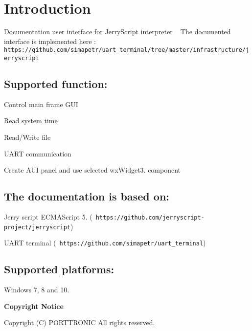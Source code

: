 \section*{{\bfseries{Introduction}}}

Documentation user interface for Jerry\+Script interpreter ~\newline
 The documented interface is implemented here \+:~\newline
 {\texttt{ https\+://github.\+com/simapetr/uart\+\_\+terminal/tree/master/infrastructure/jerryscript}}

\subsection*{Supported function\+:}


\begin{DoxyItemize}
\item Control main frame G\+UI
\item Read system time
\item Read/\+Write file
\item U\+A\+RT communication
\item Create A\+UI panel and use selected wx\+Widget3. component
\end{DoxyItemize}

\subsection*{The documentation is based on\+:}


\begin{DoxyItemize}
\item Jerry script E\+C\+M\+A\+Script 5. ({\texttt{ https\+://github.\+com/jerryscript-\/project/jerryscript}})
\item U\+A\+RT terminal ({\texttt{ https\+://github.\+com/simapetr/uart\+\_\+terminal}})
\end{DoxyItemize}

\subsection*{Supported platforms\+:}


\begin{DoxyItemize}
\item Windows 7, 8 and 10.
\end{DoxyItemize}

{\bfseries{Copyright Notice}}

Copyright (C) P\+O\+R\+T\+T\+R\+O\+N\+IC All rights reserved. 